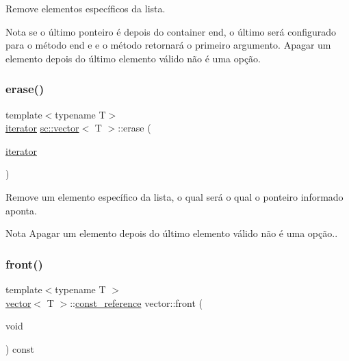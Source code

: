 Remove elementos específicos da lista.

\begin{DoxyNote}{Nota}
se o último ponteiro é depois do container end, o último será configurado para o método end e e o método retornará o primeiro argumento. Apagar um elemento depois do último elemento válido não é uma opção. 
\end{DoxyNote}
\mbox{\label{classsc_1_1vector_a1671cc04a48cfbf8b3baf2c6274aa44d}} 
\subsubsection{\texorpdfstring{erase()}{erase()}\hspace{0.1cm}{\footnotesize\ttfamily [2/2]}}
{\footnotesize\ttfamily template$<$typename T$>$ \\
\hyperlink{classsc_1_1vector_a9e5d5cc35e379aa27a93989f4a71413c}{iterator} \hyperlink{classsc_1_1vector}{sc\+::vector}$<$ T $>$\+::erase (\begin{DoxyParamCaption}\item[{\hyperlink{classsc_1_1vector_a9e5d5cc35e379aa27a93989f4a71413c}{iterator}}]{ }\end{DoxyParamCaption})}

Remove um elemento específico da lista, o qual será o qual o ponteiro informado aponta.

\begin{DoxyNote}{Nota}
Apagar um elemento depois do último elemento válido não é uma opção.. 
\end{DoxyNote}
\mbox{\label{classsc_1_1vector_aedc64f83fbbef7412eebbc609c0499d7}} 
\subsubsection{\texorpdfstring{front()}{front()}}
{\footnotesize\ttfamily template$<$typename T $>$ \\
\hyperlink{classsc_1_1vector}{vector}$<$ T $>$\+::\hyperlink{classsc_1_1vector_a8da2b1a11b069241100f9b2e14f481a0}{const\+\_\+reference} vector\+::front (\begin{DoxyParamCaption}\item[{void}]{ }\end{DoxyParamCaption}) const}



